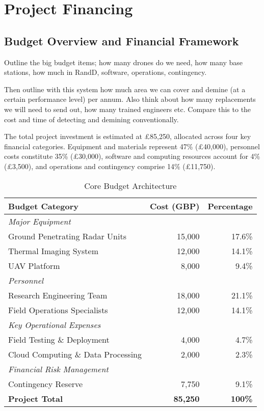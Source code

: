 \section{Project Financing}

\subsection{Budget Overview and Financial Framework}
Outline the big budget items; how many drones do we need, how many base stations, how much in RandD, software, operations, contingency.

Then outline with this system how much area we can cover and demine (at a certain performance level) per annum. Also think about how many replacements we will need to send out, how many trained engineers etc. Compare this to the cost and time of detecting and demining conventionally.

The total project investment is estimated at \pounds 85,250, allocated across four key financial categories. Equipment and materials represent 47\% (\pounds 40,000), personnel costs constitute 35\% (\pounds 30,000), software and computing resources account for 4\% (\pounds 3,500), and operations and contingency comprise 14\% (\pounds 11,750).

\begin{table}[h]
\centering
\caption{Core Budget Architecture}
\label{tab:budget}
\begin{tabular}{lrr}
\hline
\textbf{Budget Category} & \textbf{Cost (GBP)} & \textbf{Percentage} \\
\hline
\multicolumn{3}{l}{\textit{Major Equipment}} \\
Ground Penetrating Radar Units & 15,000 & 17.6\% \\
Thermal Imaging System & 12,000 & 14.1\% \\
UAV Platform & 8,000 & 9.4\% \\
\hline
\multicolumn{3}{l}{\textit{Personnel}} \\
Research Engineering Team & 18,000 & 21.1\% \\
Field Operations Specialists & 12,000 & 14.1\% \\
\hline
\multicolumn{3}{l}{\textit{Key Operational Expenses}} \\
Field Testing \& Deployment & 4,000 & 4.7\% \\
Cloud Computing \& Data Processing & 2,000 & 2.3\% \\
\hline
\multicolumn{3}{l}{\textit{Financial Risk Management}} \\
Contingency Reserve & 7,750 & 9.1\% \\
\hline
\textbf{Project Total} & \textbf{85,250} & \textbf{100\%} \\
\hline
\end{tabular}
\end{table}

